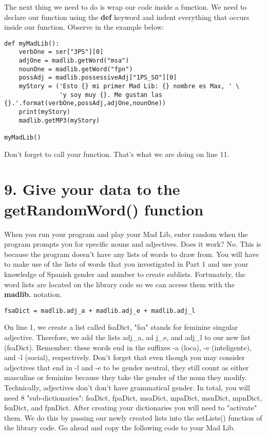 \documentclass[a4paper,11pt]{article}
\theoremstyle{mytheor}
\begin{document}
The next thing we need to do is wrap our code inside a function. We need to declare our function using the \textbf{def} keyword and indent everything that occurs inside our function. Observe in the example below:

\begin{lstlisting}[label={list:second},caption=Your program should look like this now]
def myMadLib():
	verbOne = ser["3PS"][0]
	adjOne = madlib.getWord("msa")
	nounOne = madlib.getWord("fpn")
	possAdj = madlib.possessiveAdj["1PS_SO"][0]
	myStory = ('Esto {} mi primer Mad Lib: {} nombre es Max, ' \
	 		   'y soy muy {}. Me gustan las {}.'.format(verbOne,possAdj,adjOne,nounOne))
	print(myStory)
	madlib.getMP3(myStory)

myMadLib()
\end{lstlisting}

Don't forget to call your function. That's what we are doing on line 11.

\section*{9. Give your data to the getRandomWord() function}

When you run your program and play your Mad Lib, enter random when the program prompts you for specific nouns and adjectives. 
Does it work?
No.
This is because the program doesn't have any lists of words to draw from.
You will have to make use of the lists of words that you investigated in Part 1 and use your knowledge of Spanish gender and number to create sublists. 
Fortunately, the word lists are located on the library code so we can access them with the \textbf{madlib.} notation. 

\begin{lstlisting}[label={list:second},caption=Add this to the top of your code (below the import line)]
fsaDict = madlib.adj_a + madlib.adj_e + madlib.adj_l
\end{lstlisting}
On line 1, we create a list called fsaDict, "fsa" stands for feminine singular adjective. 
Therefore, we add the lists adj\_a, ad j\_e, and adj\_l to our new list (fsaDict). 
Remember: these words  end in the suffixes -a (loca), -e (inteligente), and -l (social), respectively. 
Don't forget that even though you may consider adjectives that end in -l and -e to be gender neutral, they still count as either masculine or feminine because they take the gender of the noun they modify. 
Technically, adjectives don't don't have grammatical gender.
\newline
\newline
In total, you will need 8 "sub-dictionaries": fsaDict, fpaDict, msaDict, mpaDict, msnDict, mpnDict, fsnDict, and fpnDict.
\newline
\newline
After creating your dictionaries you will need to "activate" them. We do this by passing our newly created lists into the setLists() function of the library code. Go ahead and copy the following code to your Mad Lib.
\end{document}
